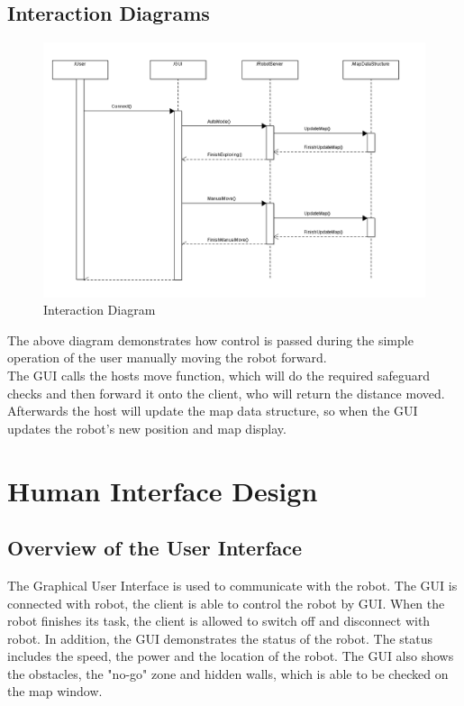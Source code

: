 \documentclass[11pt, a4paper]{report}
\begin{document}
\section{Interaction Diagrams}
\begin{figure}[h]
  \centering
    \includegraphics[width=16cm]{SEP_13_Sequence_Diagram.png} 
  \caption{Interaction Diagram}
\end{figure}
The above diagram demonstrates how control is passed during the simple operation of the user manually moving the robot forward.
\\The GUI calls the hosts move function, which will do the required safeguard checks and then forward it onto the client, who will return the distance moved.
\\Afterwards the host will update the map data structure, so when the GUI updates the robot's new position and map display.

\pagebreak


\chapter{Human Interface Design}%
\label{cha:HID}

\section{Overview of the User Interface}
The Graphical User Interface is used to communicate with the robot. The GUI is connected with robot, the client is able to control the robot by GUI. When the robot finishes its task, the client is allowed to switch off and disconnect with robot. In addition, the GUI demonstrates the status of the robot. The status includes the speed, the power and the location of the robot. The GUI also shows the obstacles, the "no-go" zone and hidden walls, which is able to be checked on the map window.\\
\end{document}
